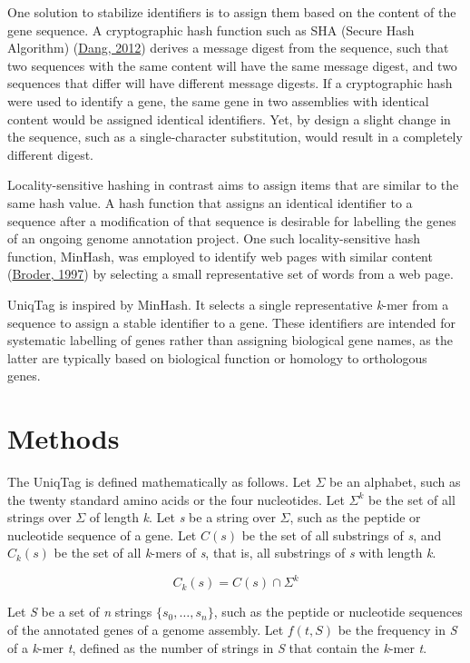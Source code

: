 \documentclass{bioinfo}
\begin{document}
One solution to stabilize identifiers is to assign them based on the
content of the gene sequence. A cryptographic hash function such as SHA
(Secure Hash Algorithm)
(\href{http://www.nist.gov/manuscript-publication-search.cfm?pub_id=910977}{Dang,
2012}) derives a message digest from the sequence, such that two
sequences with the same content will have the same message digest, and
two sequences that differ will have different message digests. If a
cryptographic hash were used to identify a gene, the same gene in two
assemblies with identical content would be assigned identical
identifiers. Yet, by design a slight change in the sequence, such as a
single-character substitution, would result in a completely different
digest.

Locality-sensitive hashing in contrast aims to assign items that are
similar to the same hash value. A hash function that assigns an
identical identifier to a sequence after a modification of that sequence
is desirable for labelling the genes of an ongoing genome annotation
project. One such locality-sensitive hash function, MinHash, was
employed to identify web pages with similar content
(\href{http://dx.doi.org/10.1109/SEQUEN.1997.666900}{Broder, 1997}) by
selecting a small representative set of words from a web page.

UniqTag is inspired by MinHash. It selects a single representative
\emph{k}-mer from a sequence to assign a stable identifier to a gene.
These identifiers are intended for systematic labelling of genes rather
than assigning biological gene names, as the latter are typically based
on biological function or homology to orthologous genes.

\section{Methods}\label{methods}

The UniqTag is defined mathematically as follows. Let $\Sigma$ be an
alphabet, such as the twenty standard amino acids or the four
nucleotides. Let $\Sigma^k$ be the set of all strings over $\Sigma$ of
length \emph{k}. Let \emph{s} be a string over $\Sigma$, such as the
peptide or nucleotide sequence of a gene. Let $C(s)$ be the set of all
substrings of \emph{s}, and $C_k(s)$ be the set of all \emph{k}-mers of
\emph{s}, that is, all substrings of \emph{s} with length \emph{k}.

\[
C_k(s) = C(s) \cap \Sigma^k
\]

Let \emph{S} be a set of \emph{n} strings $\{s_0, \dots, s_n\}$, such as
the peptide or nucleotide sequences of the annotated genes of a genome
assembly. Let $f(t, S)$ be the frequency in \emph{S} of a \emph{k}-mer
\emph{t}, defined as the number of strings in \emph{S} that contain the
\emph{k}-mer \emph{t}.
\end{document}
